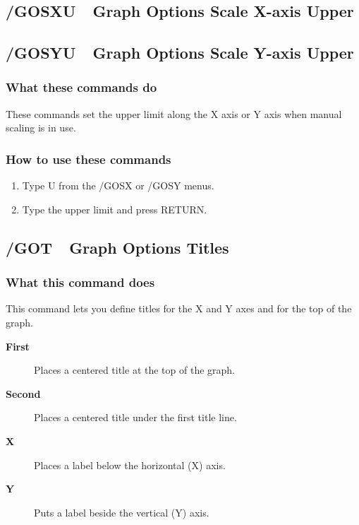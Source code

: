 \subsection*{/GOSXU\ \   Graph Options Scale X-axis Upper}
\subsection*{/GOSYU\ \   Graph Options Scale Y-axis Upper}

\subsubsection*{What these commands do}
These commands set the upper limit along the X axis or Y axis when 
manual scaling is in use.

\subsubsection*{How to use these commands}
\begin{enumerate}
\item{Type U from the /GOSX or /GOSY menus.}
\item{Type the upper limit and press RETURN.}
\end{enumerate}
 
\subsection*{/GOT\ \     Graph Options Titles}

\subsubsection*{What this command does}
This command lets you define titles for the X and Y axes and for the 
top of the graph.
\begin{description}
\item[{\bf First   }]{Places a centered title at the top of the graph.}
\item[{\bf Second  }]{Places a centered title under the first title line.}
\item[{\bf X       }]{Places a label below the horizontal (X) axis.}
\item[{\bf Y       }]{Puts a label beside the vertical (Y) axis.}
\end{description}

